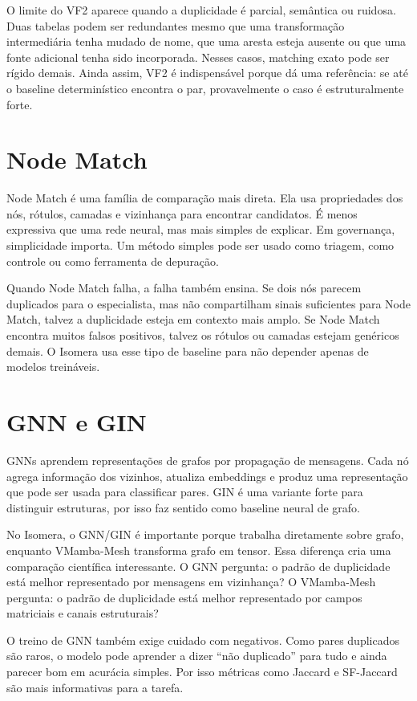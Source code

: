 \documentclass[12pt,oneside]{book}
\begin{document}
O limite do VF2 aparece quando a duplicidade é parcial, semântica ou ruidosa. Duas tabelas podem ser redundantes mesmo que uma transformação intermediária tenha mudado de nome, que uma aresta esteja ausente ou que uma fonte adicional tenha sido incorporada. Nesses casos, matching exato pode ser rígido demais. Ainda assim, VF2 é indispensável porque dá uma referência: se até o baseline determinístico encontra o par, provavelmente o caso é estruturalmente forte.

\section{Node Match}

Node Match é uma família de comparação mais direta. Ela usa propriedades dos nós, rótulos, camadas e vizinhança para encontrar candidatos. É menos expressiva que uma rede neural, mas mais simples de explicar. Em governança, simplicidade importa. Um método simples pode ser usado como triagem, como controle ou como ferramenta de depuração.

Quando Node Match falha, a falha também ensina. Se dois nós parecem duplicados para o especialista, mas não compartilham sinais suficientes para Node Match, talvez a duplicidade esteja em contexto mais amplo. Se Node Match encontra muitos falsos positivos, talvez os rótulos ou camadas estejam genéricos demais. O Isomera usa esse tipo de baseline para não depender apenas de modelos treináveis.

\section{GNN e GIN}

GNNs aprendem representações de grafos por propagação de mensagens. Cada nó agrega informação dos vizinhos, atualiza embeddings e produz uma representação que pode ser usada para classificar pares. GIN é uma variante forte para distinguir estruturas, por isso faz sentido como baseline neural de grafo.

No Isomera, o GNN/GIN é importante porque trabalha diretamente sobre grafo, enquanto VMamba-Mesh transforma grafo em tensor. Essa diferença cria uma comparação científica interessante. O GNN pergunta: o padrão de duplicidade está melhor representado por mensagens em vizinhança? O VMamba-Mesh pergunta: o padrão de duplicidade está melhor representado por campos matriciais e canais estruturais?

O treino de GNN também exige cuidado com negativos. Como pares duplicados são raros, o modelo pode aprender a dizer ``não duplicado'' para tudo e ainda parecer bom em acurácia simples. Por isso métricas como Jaccard e SF-Jaccard são mais informativas para a tarefa.
\end{document}
